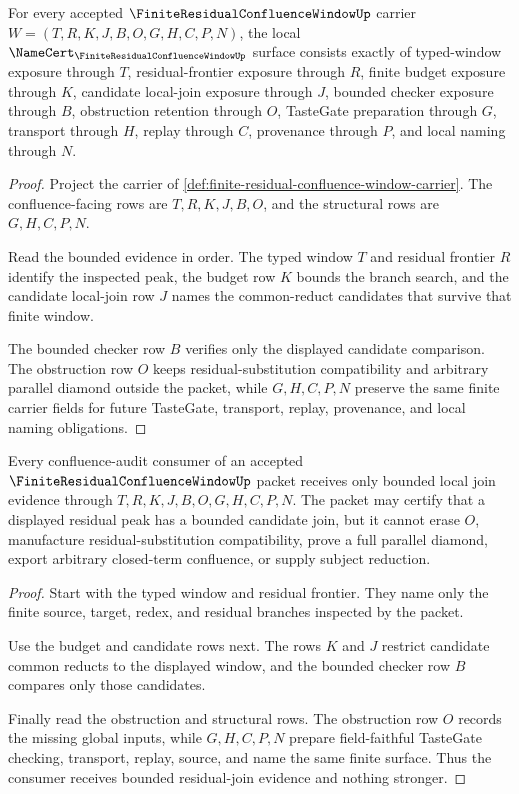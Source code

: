 \begin{theorem}
\label{thm:finite-residual-confluence-window-namecert-obligations}
For every accepted $\FiniteResidualConfluenceWindowUp$ carrier $W=(T,R,K,J,B,O,G,H,C,P,N)$, the local $\NameCert_{\FiniteResidualConfluenceWindowUp}$ surface consists exactly of typed-window exposure through $T$, residual-frontier exposure through $R$, finite budget exposure through $K$, candidate local-join exposure through $J$, bounded checker exposure through $B$, obstruction retention through $O$, TasteGate preparation through $G$, transport through $H$, replay through $C$, provenance through $P$, and local naming through $N$.
\end{theorem}
\begin{proof}
Project the carrier of \autoref{def:finite-residual-confluence-window-carrier}. The confluence-facing rows are $T,R,K,J,B,O$, and the structural rows are $G,H,C,P,N$.

Read the bounded evidence in order. The typed window $T$ and residual frontier $R$ identify the inspected peak, the budget row $K$ bounds the branch search, and the candidate local-join row $J$ names the common-reduct candidates that survive that finite window.

The bounded checker row $B$ verifies only the displayed candidate comparison. The obstruction row $O$ keeps residual-substitution compatibility and arbitrary parallel diamond outside the packet, while $G,H,C,P,N$ preserve the same finite carrier fields for future TasteGate, transport, replay, provenance, and local naming obligations.
\end{proof}

\begin{theorem}
\label{thm:finite-residual-confluence-window-nonescape}
Every confluence-audit consumer of an accepted $\FiniteResidualConfluenceWindowUp$ packet receives only bounded local join evidence through $T,R,K,J,B,O,G,H,C,P,N$. The packet may certify that a displayed residual peak has a bounded candidate join, but it cannot erase $O$, manufacture residual-substitution compatibility, prove a full parallel diamond, export arbitrary closed-term confluence, or supply subject reduction.
\end{theorem}
\begin{proof}
Start with the typed window and residual frontier. They name only the finite source, target, redex, and residual branches inspected by the packet.

Use the budget and candidate rows next. The rows $K$ and $J$ restrict candidate common reducts to the displayed window, and the bounded checker row $B$ compares only those candidates.

Finally read the obstruction and structural rows. The obstruction row $O$ records the missing global inputs, while $G,H,C,P,N$ prepare field-faithful TasteGate checking, transport, replay, source, and name the same finite surface. Thus the consumer receives bounded residual-join evidence and nothing stronger.
\end{proof}

